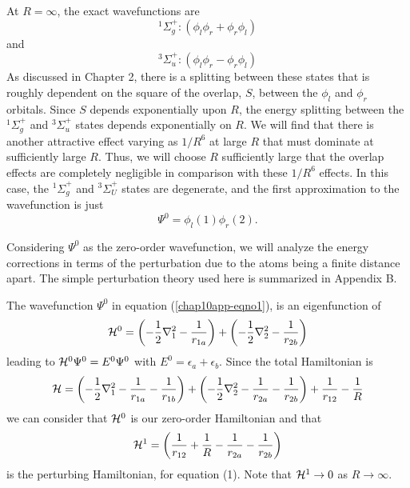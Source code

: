 At $R = \infty$, the exact wavefunctions are
\begin{equation}
{^1\Sigma}^+_g : \left( \phi_l \phi_r + \phi_r \phi_l \right)
\end{equation}
and
\begin{equation}
{^3\Sigma}^+_u : \left( \phi_l \phi_r - \phi_r \phi_l \right)
\end{equation}
As discussed in Chapter 2, there 
is a splitting between these states that is roughly 
dependent on the square of the overlap, $S$, between 
the $\phi_l$ and $\phi_r$ orbitals. Since $S$ depends exponentially 
upon $R$, the energy splitting between the ${^1\Sigma}^+_g$ and 
${^3\Sigma}^+_u$ states depends exponentially on $R$.
We will find that there is another attractive effect varying as 
$1/R^6$ at large $R$ 
that must dominate at sufficiently large $R$. Thus, we will choose $R$ 
sufficiently
large that the overlap effects are completely negligible in comparison with
these $1/R^6$ effects.  In this case, the ${^1\Sigma}^+_g$ and 
${^3\Sigma}^+_U$ states are degenerate, and
the first approximation to the wavefunction is just
\begin{equation}
\Psi^0 = \phi_l (1) \phi_r (2) .
\label{chap10app-eqno1}
\end{equation}

Considering $\Psi^0$ as the zero-order wavefunction, we will analyze 
the energy corrections in terms of the perturbation due to the 
atoms being a finite distance apart.  The simple perturbation 
theory used here is summarized in Appendix B.

The wavefunction $\Psi^0$ in equation (\ref{chap10app-eqno1}), is an
eigenfunction of
\begin{equation}
{\cal H}^0 = \left( - {1 \over 2} \nabla^2_1 - {1 \over r_{1a}} 
\right) + \left( - {1 \over 2} \nabla^2_2 - {1 \over r_{2b}} \right)
\end{equation}
leading to ${\cal H}^0 \Psi^0 = E^0 \Psi^0$ with $E^0 = \epsilon_a + 
\epsilon_b$.  Since the total Hamiltonian is
\begin{equation}
{\cal H} = \left( - {1 \over 2} \nabla^2_1 - {1 \over r_{1a}} - {1 
\over r_{1b}} \right) + \left( - {1 \over 2} \nabla^2_2 - 
{1 \over r_{2a}} - {1 \over r_{2b}} \right) + {1 \over r_{12}} - {1 \over R}
\end{equation}
we can consider that ${\cal H}^0$ is our zero-order Hamiltonian and that
\begin{equation}
{\cal H}^1 = \left( {1 \over r_{12}} + {1 \over R} - 
{1 \over r_{2a}} - {1 \over r_{2b}} \right)
\label{chap10app-eqno2}
\end{equation}
is the perturbing Hamiltonian, for equation (1).  Note that ${\cal H}^1 
\rightarrow 0$ as $R \rightarrow \infty$.

